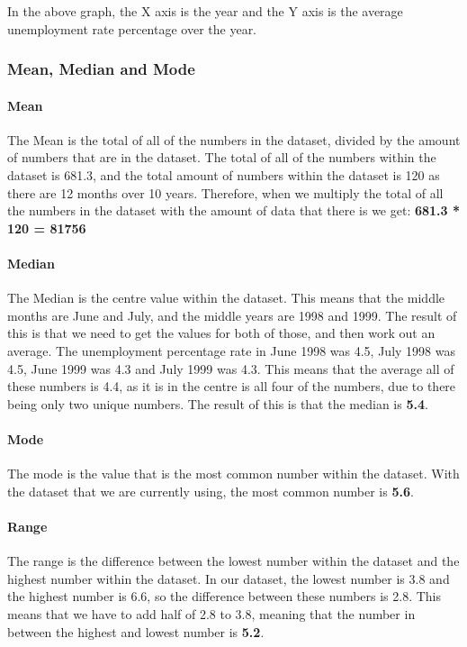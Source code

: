 \documentclass[a4paper,12pt]{article}
\begin{document}
In the above graph, the X axis is the year and the Y axis is the average unemployment rate percentage over the year.

\subsubsection{Mean, Median and Mode}
\paragraph{Mean}
The Mean is the total of all of the numbers in the dataset, divided by the amount of numbers that are in the dataset. The total of all of the numbers within the dataset is 681.3, and the total amount of numbers within the dataset is 120 as there are 12 months over 10 years. Therefore, when we multiply the total of all the numbers in the dataset with the amount of data that there is we get:
\textbf{681.3 * 120 = 81756}

\paragraph{Median}
The Median is the centre value within the dataset. This means that the middle months are June and July, and the middle years are 1998 and 1999. The result of this is that we need to get the values for both of those, and then work out an average. The unemployment percentage rate in June 1998 was 4.5, July 1998 was 4.5, June 1999 was 4.3 and July 1999 was 4.3. This means that the average all of these numbers is 4.4, as it is in the centre is all four of the numbers, due to there being only two unique numbers. The result of this is that the median is \textbf{5.4}.

\paragraph{Mode}
The mode is the value that is the most common number within the dataset. With the dataset that we are currently using, the most common number is \textbf{5.6}.

\paragraph{Range}
The range is the difference between the lowest number within the dataset and the highest number within the dataset. In our dataset, the lowest number is 3.8 and the highest number is 6.6, so the difference between these numbers is 2.8. This means that we have to add half of 2.8 to 3.8, meaning that the number in between the highest and lowest number is \textbf{5.2}.
\end{document}
